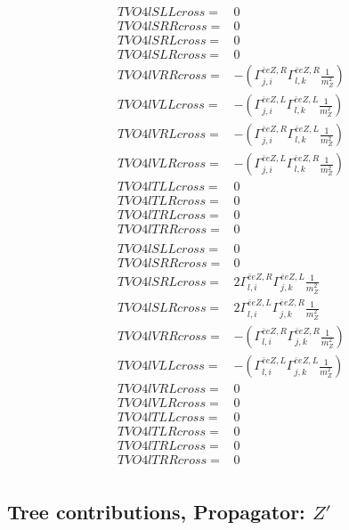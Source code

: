 \documentclass[A4,landscape]{article}
\begin{document}
\begin{align} 
  TVO4lSLLcross= & 0 \\ 
  TVO4lSRRcross= & 0 \\ 
  TVO4lSRLcross= & 0 \\ 
  TVO4lSLRcross= & 0 \\ 
  TVO4lVRRcross= & -(\Gamma^{\bar{e}e Z ,R}_{j, i} \Gamma^{\bar{e}e Z ,R}_{l, k} \frac{1}{m^2_{Z}}) \\ 
  TVO4lVLLcross= & -(\Gamma^{\bar{e}e Z ,L}_{j, i} \Gamma^{\bar{e}e Z ,L}_{l, k} \frac{1}{m^2_{Z}}) \\ 
  TVO4lVRLcross= & -(\Gamma^{\bar{e}e Z ,R}_{j, i} \Gamma^{\bar{e}e Z ,L}_{l, k} \frac{1}{m^2_{Z}}) \\ 
  TVO4lVLRcross= & -(\Gamma^{\bar{e}e Z ,L}_{j, i} \Gamma^{\bar{e}e Z ,R}_{l, k} \frac{1}{m^2_{Z}}) \\ 
  TVO4lTLLcross= & 0 \\ 
  TVO4lTLRcross= & 0 \\ 
  TVO4lTRLcross= & 0 \\ 
  TVO4lTRRcross= & 0 \\ 
\end{align} 
\begin{align} 
  TVO4lSLLcross= & 0 \\ 
  TVO4lSRRcross= & 0 \\ 
  TVO4lSRLcross= & 2 \Gamma^{\bar{e}e Z ,R}_{l, i} \Gamma^{\bar{e}e Z ,L}_{j, k} \frac{1}{m^2_{Z}} \\ 
  TVO4lSLRcross= & 2 \Gamma^{\bar{e}e Z ,L}_{l, i} \Gamma^{\bar{e}e Z ,R}_{j, k} \frac{1}{m^2_{Z}} \\ 
  TVO4lVRRcross= & -(\Gamma^{\bar{e}e Z ,R}_{l, i} \Gamma^{\bar{e}e Z ,R}_{j, k} \frac{1}{m^2_{Z}}) \\ 
  TVO4lVLLcross= & -(\Gamma^{\bar{e}e Z ,L}_{l, i} \Gamma^{\bar{e}e Z ,L}_{j, k} \frac{1}{m^2_{Z}}) \\ 
  TVO4lVRLcross= & 0 \\ 
  TVO4lVLRcross= & 0 \\ 
  TVO4lTLLcross= & 0 \\ 
  TVO4lTLRcross= & 0 \\ 
  TVO4lTRLcross= & 0 \\ 
  TVO4lTRRcross= & 0 \\ 
\end{align} 
\subsection{Tree contributions, Propagator: ${Z'}$} 
\end{document}
